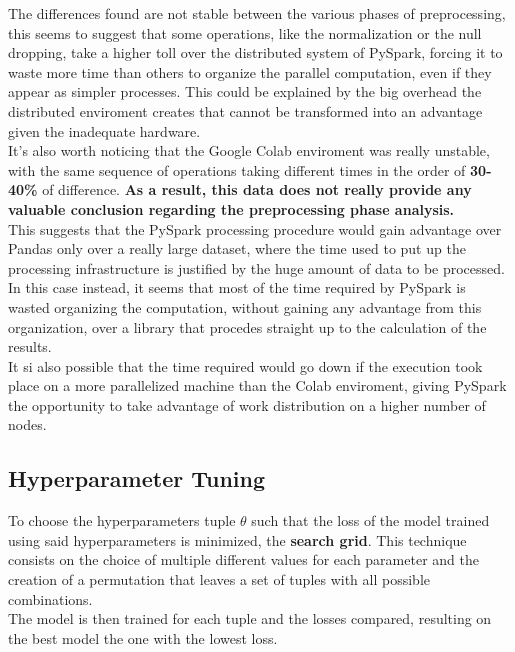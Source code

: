 \documentclass[
	letterpaper, %
	10pt, %
]{class}
\begin{document}
The differences found are not stable between the various phases of preprocessing, this seems to suggest that some operations, like the normalization or the null dropping, take a higher toll over the distributed system of PySpark,
forcing it to waste more time than others to organize the parallel computation, even if they appear as simpler processes.
This could be explained by the big overhead the distributed enviroment creates that cannot be transformed into an advantage given the inadequate hardware.\\

It's also worth noticing that the Google Colab enviroment was really unstable, with the same sequence of operations taking different times in the order of \textbf{30-40\%} of difference.
\textbf{As a result, this data does not really provide any valuable conclusion regarding the preprocessing phase analysis.}\\

This suggests that the PySpark processing procedure would gain advantage over Pandas only over a really large dataset, where the time used to put up the processing infrastructure is justified by the huge amount of data to be processed.
In this case instead, it seems that most of the time required by PySpark is wasted organizing the computation, without gaining any advantage from this organization, over a library that procedes straight up to the calculation of the results.\\

It si also possible that the time required would go down if the execution took place on a more parallelized machine than the Colab enviroment, giving PySpark the opportunity to take advantage of work distribution on a higher number of nodes.

\subsection{Hyperparameter Tuning}
To choose the hyperparameters tuple $\theta$ such that the loss of the model trained using said hyperparameters is minimized, the \textbf{search grid}.
This technique consists on the choice of multiple different values for each parameter and the creation of a permutation that leaves a set of tuples with all possible combinations.\\
The model is then trained for each tuple and the losses compared, resulting on the best model the one with the lowest loss.
\end{document}
